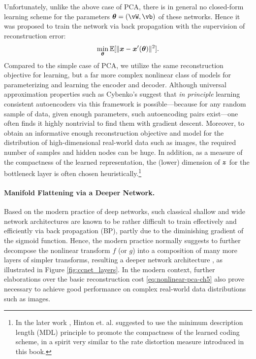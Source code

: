 \documentclass[../../book-main.tex]{subfiles}
\begin{document}
Unfortunately, unlike the above case of PCA, there is in general no
closed-form learning scheme for the parameters $\boldsymbol{\theta} =
(\vW, \vb)$ of these networks. Hence it was proposed to train the
network via back propagation with the supervision of reconstruction error:
\begin{equation}\label{eq:nonlinear-pca-ch5}
  \min_{\boldsymbol{\theta}} \mathbb{E}[ \|\bm{x} - \bm{x}'(\boldsymbol{\theta})\|^2].
\end{equation}
Compared to the simple case of PCA, we utilize the same reconstruction objective
for learning, but a far more complex nonlinear class of models for
parameterizing and learning the encoder and decoder. Although universal
approximation properties such as Cybenko's suggest that \textit{in principle}
learning consistent autoencoders via this framework is possible---because for
any random sample of data, given enough parameters, such autoencoding pairs
exist---one often finds it highly nontrivial to find them with gradient descent.
Moreover, to obtain an informative enough reconstruction objective
and model for the
distribution of high-dimensional real-world data such as images, the required
number of samples and hidden nodes can be huge.
In addition, as a measure of the compactness of the learned representation, the
(lower) dimension of $\bm{z}$ for the bottleneck layer is often chosen
heuristically.\footnote{In the later work \cite{Hinton-1993}, Hinton et.
  al. suggested to use the minimum description length (MDL) principle to promote
  the compactness of the learned coding scheme, in a spirit very similar to the
rate distortion measure introduced in this book.}

\paragraph{Manifold Flattening via a Deeper Network.}
Based on the modern practice of deep networks, such classical shallow
and wide network architectures are known to be rather difficult to
train effectively and efficiently via back propagation (BP), partly
due to the diminishing gradient of the sigmoid function. Hence, the
modern practice normally suggests to further
decompose the nonlinear transform $f$ (or $g$) into a composition of
many more layers of simpler transforms, resulting a deeper network architecture
\cite{Hinton504}, as illustrated in Figure \ref{fig:ccnet_layers}.
In the modern context, further elaborations over the basic reconstruction cost
\eqref{eq:nonlinear-pca-ch5} also prove necessary to achieve good performance on
complex real-world data distributions such as images.
\end{document}
